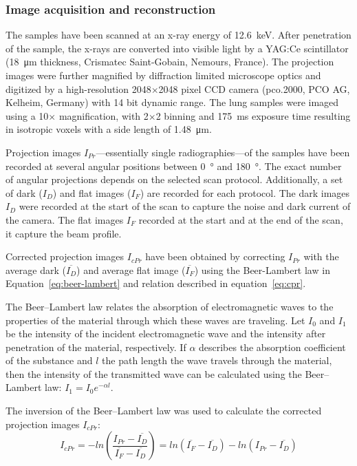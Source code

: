 \subsubsection{Image acquisition and reconstruction}%
\label{seq:Image Acquisition}%
The samples have been scanned at an x-ray energy of \SI{12.6}{\kilo\electronvolt}. After penetration of the sample, the x-rays are converted into visible light by a YAG:Ce scintillator (\SI{18}{\micro\meter} thickness, Crismatec Saint-Gobain, Nemours, France). The projection images were further magnified by diffraction limited microscope optics and digitized by a high-resolution 2048$\times$2048 pixel CCD camera (pco.2000, PCO AG, Kelheim, Germany) with 14 bit dynamic range. %
The lung samples were imaged using a 10$\times$ magnification, with 2$\times$2 binning and \SI{175}{\milli\second} exposure time resulting in isotropic voxels with a side length of \SI{1.48}{\micro\meter}.

Projection images $I_{Pr}$---essentially single radiographies---of the samples have been recorded at several angular positions between \SI{0}{\degree} and \SI{180}{\degree}. The exact number of angular projections depends on the selected scan protocol. Additionally, a set of dark ($I_{D}$) and flat images ($I_{F}$) are recorded for each protocol. The dark images $I_{D}$ were recorded at the start of the scan to capture the noise and dark current of the camera. The flat images $I_{F}$ recorded at the start and at the end of the scan, it capture the beam profile.

Corrected projection images $I_{cPr}$ have been obtained by correcting $I_{Pr}$ with the average dark ($\overline{I_{D}}$) and average flat image ($\overline{I_{F}}$) using the Beer-Lambert law in Equation~\ref{eq:beer-lambert} and relation described in equation~\ref{eq:cpr}.

The Beer--Lambert law relates the absorption of electromagnetic waves to the properties of the material through which these waves are traveling. Let $I_{0}$ and $I_{1}$ be the intensity of the incident electromagnetic wave and the intensity after penetration of the material, respectively. If $\alpha$ describes the absorption coefficient of the substance and $l$ the path length the wave travels through the material, then the intensity of the transmitted wave can be calculated using the Beer--Lambert law: \(I_{1}=I_{0}e^{-\alpha l}\label{eq:beer-lambert}\).

The inversion of the Beer--Lambert law was used to calculate the corrected projection images $I_{cPr}$:
\begin{equation}
	I_{cPr} = -ln\left(\frac{I_{Pr}-\overline{I_{D}}}{\overline{I_{F}}-\overline{I_{D}}}\right)
	= ln(\overline{I_{F}}-\overline{I_{D}})-ln(I_{Pr}-\overline{I_{D}})
	\label{eq:cpr}
\end{equation}

